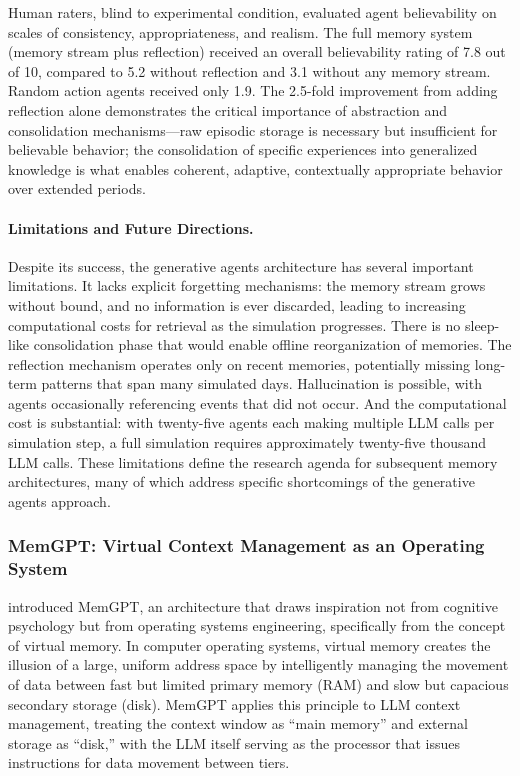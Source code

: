 Human raters, blind to experimental condition, evaluated agent believability on scales of consistency, appropriateness, and realism. The full memory system (memory stream plus reflection) received an overall believability rating of 7.8 out of 10, compared to 5.2 without reflection and 3.1 without any memory stream. Random action agents received only 1.9. The 2.5-fold improvement from adding reflection alone demonstrates the critical importance of abstraction and consolidation mechanisms---raw episodic storage is necessary but insufficient for believable behavior; the consolidation of specific experiences into generalized knowledge is what enables coherent, adaptive, contextually appropriate behavior over extended periods.

\paragraph{Limitations and Future Directions.} Despite its success, the generative agents architecture has several important limitations. It lacks explicit forgetting mechanisms: the memory stream grows without bound, and no information is ever discarded, leading to increasing computational costs for retrieval as the simulation progresses. There is no sleep-like consolidation phase that would enable offline reorganization of memories. The reflection mechanism operates only on recent memories, potentially missing long-term patterns that span many simulated days. Hallucination is possible, with agents occasionally referencing events that did not occur. And the computational cost is substantial: with twenty-five agents each making multiple LLM calls per simulation step, a full simulation requires approximately twenty-five thousand LLM calls. These limitations define the research agenda for subsequent memory architectures, many of which address specific shortcomings of the generative agents approach.

\subsubsection{MemGPT: Virtual Context Management as an Operating System}

\citet{packer2023memgpt} introduced MemGPT, an architecture that draws inspiration not from cognitive psychology but from operating systems engineering, specifically from the concept of virtual memory. In computer operating systems, virtual memory creates the illusion of a large, uniform address space by intelligently managing the movement of data between fast but limited primary memory (RAM) and slow but capacious secondary storage (disk). MemGPT applies this principle to LLM context management, treating the context window as ``main memory'' and external storage as ``disk,'' with the LLM itself serving as the processor that issues instructions for data movement between tiers.

